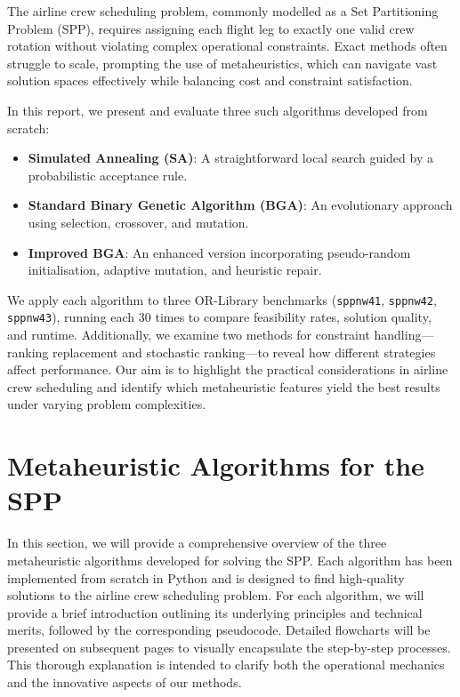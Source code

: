 \documentclass[12pt]{article}
\begin{document}
The airline crew scheduling problem, commonly modelled as a Set Partitioning Problem (SPP), requires assigning each flight leg to exactly one valid crew rotation without violating complex operational constraints. Exact methods often struggle to scale, prompting the use of metaheuristics, which can navigate vast solution spaces effectively while balancing cost and constraint satisfaction.

In this report, we present and evaluate three such algorithms developed from scratch:
\begin{itemize}
  \item \textbf{Simulated Annealing (SA)}: A straightforward local search guided by a probabilistic acceptance rule.
  \item \textbf{Standard Binary Genetic Algorithm (BGA)}: An evolutionary approach using selection, crossover, and mutation.
  \item \textbf{Improved BGA}: An enhanced version incorporating pseudo-random initialisation, adaptive mutation, and heuristic repair.
\end{itemize}

We apply each algorithm to three OR-Library benchmarks (\texttt{sppnw41}, \texttt{sppnw42}, \texttt{sppnw43}), running each 30 times to compare feasibility rates, solution quality, and runtime. 
Additionally, we examine two methods for constraint handling—ranking replacement and stochastic ranking—to reveal how different strategies affect performance. 
Our aim is to highlight the practical considerations in airline crew scheduling and identify which metaheuristic features yield the best results under varying problem complexities.

\section{Metaheuristic Algorithms for the SPP}

In this section, we will provide a comprehensive overview of the three metaheuristic algorithms developed for solving the SPP. Each algorithm has been implemented from scratch in Python and is designed to find high-quality solutions to the airline crew scheduling problem.
For each algorithm, we will provide a brief introduction outlining its underlying principles and technical merits, followed by the corresponding pseudocode. Detailed flowcharts will be presented on subsequent pages to visually encapsulate the step-by-step processes. 
This thorough explanation is intended to clarify both the operational mechanics and the innovative aspects of our methods. 
\end{document}
